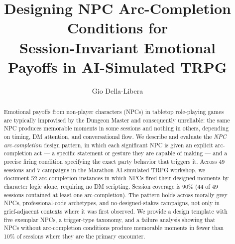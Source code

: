 \documentclass[sigconf]{acmart}
\begin{document}
\title{Designing NPC Arc-Completion Conditions for\\
       Session-Invariant Emotional Payoffs in AI-Simulated TRPG}

\author{Gio Della-Libera}

\begin{abstract}
Emotional payoffs from non-player characters (NPCs) in tabletop role-playing
games are typically improvised by the Dungeon Master and consequently unreliable:
the same NPC produces memorable moments in some sessions and nothing in others,
depending on timing, DM attention, and conversational flow. We describe and
evaluate the \textit{NPC arc-completion} design pattern, in which each significant NPC is
given an explicit arc-completion act --- a specific statement or gesture they are
capable of making --- and a precise firing condition specifying the exact party
behavior that triggers it. Across 49 sessions and 7 campaigns in the Marathon
AI-simulated TRPG workshop, we document 52 arc-completion instances in which
NPCs fired their designed moments by character logic alone, requiring no DM
scripting. Session coverage is 90\% (44 of 49 sessions contained at least one
arc-completion). The pattern holds across morally grey NPCs, professional-code
archetypes, and no-designed-stakes campaigns, not only in grief-adjacent contexts
where it was first observed. We provide a design template with five exemplar
NPCs, a trigger-type taxonomy, and a failure analysis showing that NPCs without
arc-completion conditions produce memorable moments in fewer than 10\% of
sessions where they are the primary encounter.
\end{abstract}


\maketitle










\end{document}
